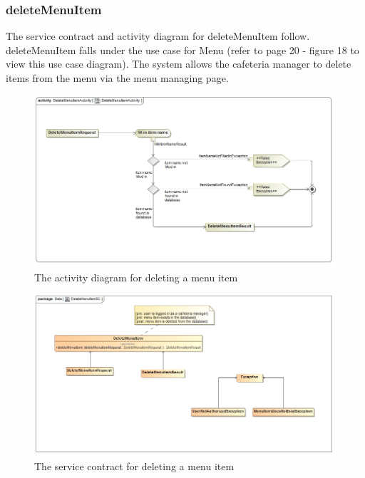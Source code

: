 \documentclass[a4paper,12pt]{report}
\begin{document}
 \subsubsection{deleteMenuItem}
The service contract and activity diagram for deleteMenuItem follow. deleteMenuItem falls under the use case for Menu (refer to page  20 - figure 18 to view this use case diagram). The system allows the cafeteria manager to delete items from the menu via the menu managing page.
\begin{figure}[H]
  \centering
    \includegraphics[width=1.0\textwidth]{../images/DeleteMenuItemActivity.jpg}
    \caption{The activity diagram for deleting a menu item } 
\end{figure}
\begin{figure}[H]
	\centering
	\includegraphics[width=1.0\textwidth]{../images/DeleteMenuItemSC.jpg}
	\caption{The service contract for deleting a menu item}
\end{figure}
\end{document}
